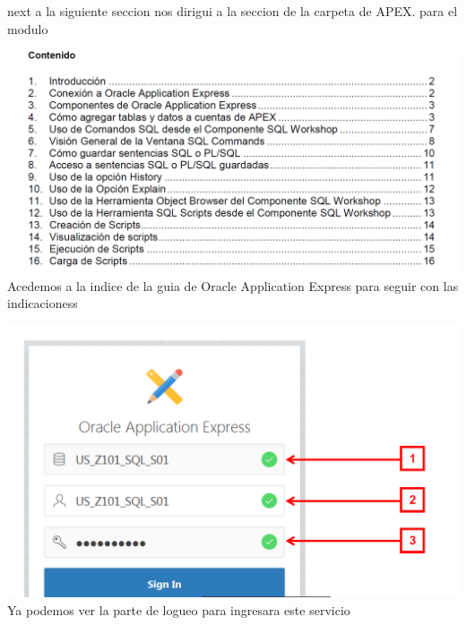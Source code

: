 \documentclass[12pt,letterpaper]{article}
\begin{document}
\begin{enumerate}[1.]
  next a la siguiente seccion	nos dirigui a la seccion de la carpeta de APEX. para el modulo
    
 

 \includegraphics[width=15cm]{./carolinaImagen/imagen2.png} 
 Acedemos a la indice de la guia de Oracle Application Express para  seguir con las indicacioness
 
 
 
 \newpage
       
     \includegraphics[width=15cm]{./carolinaImagen/imagen3.png} 
    Ya podemos ver la parte de logueo para ingresara este servicio 
    
    
    
    
    
    
    
    
    
    
    
    \newpage
    
     
     
     
     
     
     
     
     
     
     

\end{enumerate}
\end{document}
